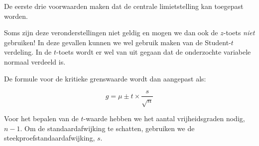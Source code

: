 De eerste drie voorwaarden maken dat de centrale limietstelling kan toegepast worden.

Soms zijn deze veronderstellingen niet geldig en mogen we dan ook de $z$-toets \emph{niet} gebruiken! In deze gevallen kunnen we wel gebruik maken van de Student-$t$ verdeling. In de $t$-toets wordt er wel van uit gegaan dat de onderzochte variabele normaal verdeeld is.

De formule voor de kritieke grenswaarde wordt dan aangepast als:

\begin{equation}
g = \mu \pm t \times \frac{s}{\sqrt{n}}
\label{eq:kritieke-waarde-t-toets}
\end{equation}

Voor het bepalen van de $t$-waarde hebben we het aantal vrijheidsgraden nodig, $n-1$. Om de standaardafwijking te schatten, gebruiken we de steekproefstandaardafwijking, $s$.

